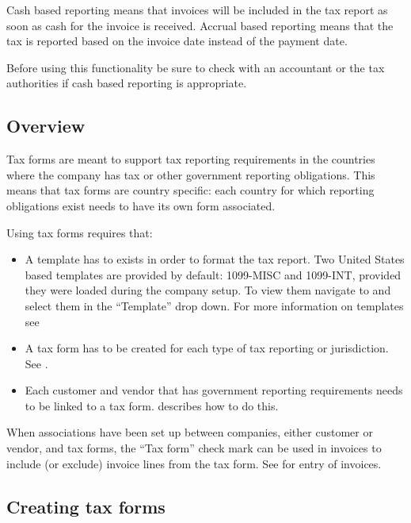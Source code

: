 Cash based  reporting means that invoices will be included in the tax report
as soon as cash for the invoice is received. Accrual based  reporting means that the
tax is reported based on the invoice date instead of the payment date.

Before using this functionality be sure to check with an accountant or the tax
authorities if cash based reporting is appropriate.

\subsection{Overview}
\label{subsec-tax-taxforms-overview}

Tax forms are meant to support tax reporting requirements in the countries
where the company has tax or other government reporting obligations. This means that tax forms
are country specific: each country for which reporting obligations exist
needs to have its own form associated.

Using tax forms requires that:
\begin{itemize}
\item A template has to exists in order to format the tax report.  Two United States based templates are provided by default: 1099-MISC and 1099-INT, provided they were loaded during the company setup. To view them navigate to  and select them in the ``Template'' drop down. For more information on templates see 
\item A tax form has to be created for each type of tax reporting or jurisdiction. See .
\item  Each customer and vendor that has government reporting requirements needs to be
linked to a tax form.  describes how to do this.
\end{itemize}

When associations have been set up between companies, either customer or vendor, and
tax forms, the ``Tax form'' check mark can be used in invoices to include
(or exclude) invoice lines from the tax form. See 
for entry of invoices.

\subsection{Creating tax forms}
\label{subsec-tax-taxforms-creation}

